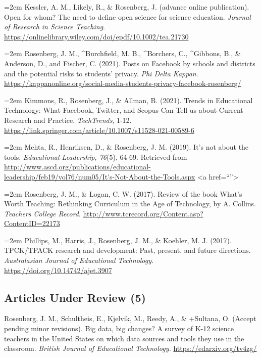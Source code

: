 \documentclass[
  14,
]{article}
\begin{document}
\hangindent=2em Kessler, A. M., Likely, R., \& Rosenberg, J. (advance
online publication). Open for whom? The need to define open science for
science education. \emph{Journal of Research in Science Teaching}.
\url{https://onlinelibrary.wiley.com/doi/epdf/10.1002/tea.21730}

\hangindent=2em Rosenberg, J. M., \^{}Burchfield, M. B., \^{}Borchers,
C., \^{}Gibbons, B., \& Anderson, D., and Fischer, C. (2021). Posts on
Facebook by schools and districts and the potential risks to students'
privacy. \emph{Phi Delta Kappan}.
\url{https://kappanonline.org/social-media-students-privacy-facebook-rosenberg/}

\hangindent=2em Kimmons, R., Rosenberg, J., \& Allman, B. (2021). Trends
in Educational Technology: What Facebook, Twitter, and Scopus Can Tell
us about Current Research and Practice. \emph{TechTrends}, 1-12.
\url{https://link.springer.com/article/10.1007/s11528-021-00589-6}

\hangindent=2em Mehta, R., Henriksen, D., \& Rosenberg, J. M. (2019).
It's not about the tools. \emph{Educational Leadership, 76}(5), 64-69.
Retrieved from
\url{http://www.ascd.org/publications/educational-leadership/feb19/vol76/num05/It's-Not-About-the-Tools.aspx}
\textless a href=``''\textgreater{}

\hangindent=2em Rosenberg, J. M., \& Logan, C. W. (2017). Review of the
book What's Worth Teaching: Rethinking Curriculum in the Age of
Technology, by A. Collins. \emph{Teachers College Record}.
\url{http://www.tcrecord.org/Content.asp?ContentID=22173}

\hangindent=2em Phillips, M., Harris, J., Rosenberg, J. M., \& Koehler,
M. J. (2017). TPCK/TPACK research and development: Past, present, and
future directions. \emph{Australasian Journal of Educational
Technology}. \url{https://doi.org/10.14742/ajet.3907}

\hypertarget{articles-under-review-5}{%
\subsection{Articles Under Review (5)}\label{articles-under-review-5}}

Rosenberg, J. M., Schultheis, E., Kjelvik, M., Reedy, A., \& +Sultana,
O. (Accept pending minor revisions). Big data, big changes? A survey of
K-12 science teachers in the United States on which data sources and
tools they use in the classroom. \emph{British Journal of Educational
Technology.} \url{https://edarxiv.org/tv4zg/}
\end{document}
